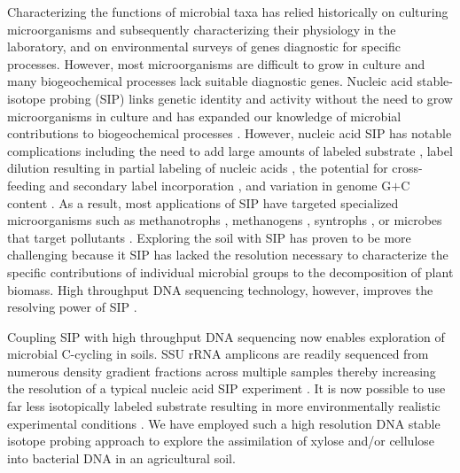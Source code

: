 Characterizing the functions of microbial taxa has relied historically on
culturing microorganisms and subsequently characterizing their physiology in
the laboratory, and on environmental surveys of genes diagnostic for specific
processes. However, most microorganisms are difficult to grow in culture
\citep{Janssen2006} and many biogeochemical processes lack suitable diagnostic
genes. Nucleic acid stable-isotope probing (SIP) links genetic identity and
activity without the need to grow microorganisms in culture and has expanded
our knowledge of microbial contributions to biogeochemical processes
\citep{Chen_Murrell_2010}. However, nucleic acid SIP has notable complications
including the need to add large amounts of labeled substrate
\citep{radajewski2000stable}, label dilution resulting in partial labeling of
nucleic acids \citep{radajewski2000stable,Manefield_2002,McDonald_2005}, the
potential for cross-feeding and secondary label incorporation
\citep{Morris_2002,Hutchens2004,14686943,DeRito2005,McDonald_2005,Ziegler_2005},
and variation in genome G$+$C content
\citep{Buckley_2007,9780408708036,Holben1995,Nusslein1999}. As a result, most
applications of SIP have targeted specialized microorganisms such as
methanotrophs \citep{radajewski2000stable}, methanogens \citep{lu2005},
syntrophs \citep{lueders2004}, or microbes that target pollutants
\citep{derito2005}. Exploring the soil with SIP has proven to be more
challenging because it SIP has lacked the resolution necessary to characterize
the specific contributions of individual microbial groups to the decomposition
of plant biomass. High throughput DNA sequencing technology, however, improves
the resolving power of SIP \citep{Aoyagi2015}. 

Coupling SIP with high throughput DNA sequencing now enables exploration of
microbial C-cycling in soils. SSU rRNA amplicons are readily sequenced from
numerous density gradient fractions across multiple samples thereby increasing
the resolution of a typical nucleic acid SIP experiment
\citep{Verastegui_2014}. It is now possible to use far less isotopically
labeled substrate resulting in more environmentally realistic experimental
conditions \citep{Aoyagi2015}. We have employed such a high resolution DNA
stable isotope probing approach to explore the assimilation of 
xylose and/or cellulose into bacterial DNA in an agricultural soil. 

